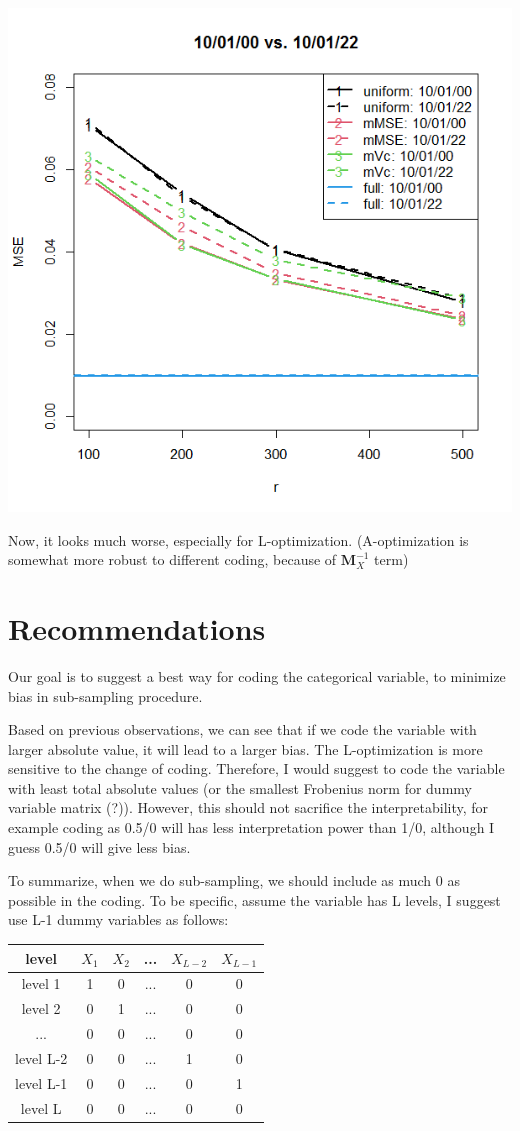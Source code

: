 \documentclass[]{article}
\begin{document}
\includegraphics[width = .8\textwidth]{plot_2levels_2.png}

Now, it looks much worse, especially for L-optimization. (A-optimization is somewhat more robust to different coding, because of $\boldsymbol{M}_{X}^{-1}$ term)

\section{Recommendations}

Our goal is to suggest a best way for coding the categorical variable, to minimize bias in sub-sampling procedure.

Based on previous observations, we can see that if we code the variable with larger absolute value, it will lead to a larger bias. The L-optimization is more sensitive to the change of coding. Therefore, I would suggest to code the variable with least total absolute values (or the smallest Frobenius norm for dummy variable matrix (?)). However, this should not sacrifice the interpretability, for example coding as 0.5/0 will has less interpretation power than 1/0, although I guess 0.5/0 will give less bias.

To summarize, when we do sub-sampling, we should include as much 0 as possible in the coding. To be specific, assume the variable has L levels, I suggest use L-1 dummy variables as follows:\\


\begin{tabular}{|c|c|c|c|c|c|}
	\hline
	level& $X_1$& $X_2$&...&$X_{L-2}$&$X_{L-1}$\\
	\hline
	level 1 & 1 & 0 & ... & 0 & 0 \\
	\hline
	level 2 & 0 & 1 & ... & 0 & 0 \\
	\hline
	... & 0 & 0 & ... & 0 & 0 \\
	\hline
	level L-2 & 0 & 0 & ... & 1 & 0 \\
	\hline
	level L-1 & 0 & 0 & ... & 0 & 1 \\
	\hline
	level L & 0 & 0 & ... & 0 & 0 \\
	\hline
\end{tabular}
\\
\end{document}
